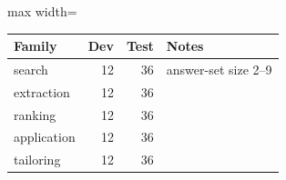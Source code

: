 {\small
\begin{adjustbox}{max width=\linewidth}
\begin{tabular}{l r r l}
\toprule
Family & Dev & Test & Notes \\
\midrule
search & 12 & 36 & answer-set size 2--9 \\
extraction & 12 & 36 &  \\
ranking & 12 & 36 &  \\
application & 12 & 36 &  \\
tailoring & 12 & 36 &  \\
\bottomrule
\end{tabular}
\end{adjustbox}
}
